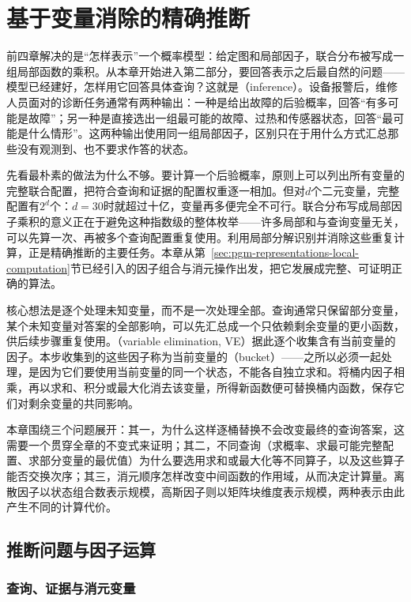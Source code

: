 \chapter{基于变量消除的精确推断}
\label{chap:pgm-elimination}

前四章解决的是“怎样表示”一个概率模型：给定图和局部因子，联合分布被写成一组局部函数的乘积。从本章开始进入第二部分，要回答表示之后最自然的问题——模型已经建好，怎样用它回答具体查询？这就是（inference）。设备报警后，维修人员面对的诊断任务通常有两种输出：一种是给出故障的后验概率，回答“有多可能是故障”；另一种是直接选出一组最可能的故障、过热和传感器状态，回答“最可能是什么情形”。这两种输出使用同一组局部因子，区别只在于用什么方式汇总那些没有观测到、也不要求作答的状态。

先看最朴素的做法为什么不够。要计算一个后验概率，原则上可以列出所有变量的完整联合配置，把符合查询和证据的配置权重逐一相加。但对$d$个二元变量，完整配置有$2^d$个：$d=30$时就超过十亿，变量再多便完全不可行。联合分布写成局部因子乘积的意义正在于避免这种指数级的整体枚举——许多局部和与查询变量无关，可以先算一次、再被多个查询配置重复使用。利用局部分解识别并消除这些重复计算，正是精确推断的主要任务。本章从第~\ref{sec:pgm-representations-local-computation}节已经引入的因子组合与消元操作出发，把它发展成完整、可证明正确的算法。

核心想法是逐个处理未知变量，而不是一次处理全部。查询通常只保留部分变量，某个未知变量对答案的全部影响，可以先汇总成一个只依赖剩余变量的更小函数，供后续步骤重复使用。（variable elimination, VE）据此逐个收集含有当前变量的因子。本步收集到的这些因子称为当前变量的（bucket）——之所以必须一起处理，是因为它们要使用当前变量的同一个状态，不能各自独立求和。将桶内因子相乘，再以求和、积分或最大化消去该变量，所得新函数便可替换桶内函数，保存它们对剩余变量的共同影响。

本章围绕三个问题展开：其一，为什么这样逐桶替换不会改变最终的查询答案，这需要一个贯穿全章的不变式来证明；其二，不同查询（求概率、求最可能完整配置、求部分变量的最优值）为什么要选用求和或最大化等不同算子，以及这些算子能否交换次序；其三，消元顺序怎样改变中间函数的作用域，从而决定计算量。离散因子以状态组合数表示规模，高斯因子则以矩阵块维度表示规模，两种表示由此产生不同的计算代价。

\section{推断问题与因子运算}
\label{sec:pgm-elimination-factor-operations}

\subsection{查询、证据与消元变量}
\label{sec:pgm-elimination-query-evidence}

